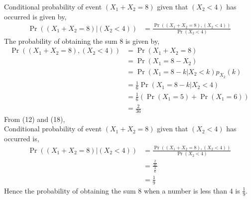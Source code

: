 \documentclass[10pt,column]{article}
\providecommand{\pr}[1]{\ensuremath{\Pr\left(#1\right)}}
\providecommand{\brak}[1]{\ensuremath{\left(#1\right)}}
\begin{document}
\begin{enumerate}
Conditional probability of event $(X_1 + X_2 = 8)$ given that $(X_2 < 4)$ has occurred is given by, 
\begin{align}
\Pr{\brak{\brak{X_1 + X_2 = 8}|\brak{X_2<4}}} 
&= \frac{\Pr{((X_1 + X_2 = 8),(X_2 < 4))}}{\Pr{\brak{X_2 < 4}}} 
\end{align} 
The probability of obtaining the sum 8 is given by,
\begin{align}
\Pr{\brak{\brak{X_1 + X_2 = 8},\brak{X_2<4}}} 
&= \pr{X_1 + X_2 = 8} \\
&= \pr{X_1  = 8 -X_2} \\
&= \pr{X_1  = 8 -k | X_2 < k}p_{X_2}(k) \\
&= \frac{1}{6} \pr{X_1  = 8 -k | X_2 < 4} \\
&= \frac{1}{6} (\pr{X_1 = 5} + \pr{X_1 = 6}) \\
&= \frac{2}{36}
\end{align}
From (12) and (18), \\
Conditional probability of event $(X_1 + X_2 = 8)$ given that $(X_2 < 4)$ has occurred is, 
\begin{align}
\Pr{\brak{\brak{X_1 + X_2 = 8}|\brak{X_2<4}}} 
&= \frac{\Pr{((X_1 + X_2 = 8),(X_2 < 4))}}{\Pr{\brak{X_2 < 4}}} \\
&= \frac{\frac{2}{36}}{\frac{3}{6}}\\
&= \frac{1}{9}
\end{align} 
Hence the probability of obtaining the sum 8 when a number is less than 4 is $\frac{1}{9}$. 
\end{enumerate}
\end{document}
